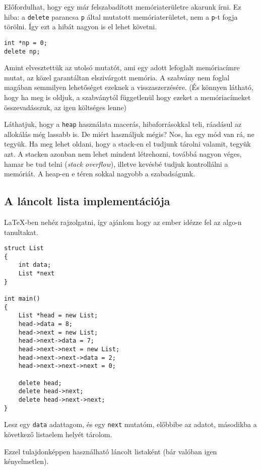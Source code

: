 \documentclass[a4paper,11.5pt]{article}
\begin{document}
	Előfordulhat, hogy egy már felszabadított memóriaterületre akarunk írni. Ez hiba: a \texttt{delete} parancsa \texttt{p} által mutatott memóriaterületet, nem a \texttt{p}-t fogja törölni. Így ezt a hibát nagyon is el lehet követni.
	\begin{lstlisting}
int *np = 0;
delete np;
	\end{lstlisting}
	\begin{note}
		Amint elvesztettük az utolsó mutatót, ami egy adott lefoglalt memóriacímre mutat, az közel garantáltan elszivárgott memória. A szabvány nem foglal magában semmilyen lehetőséget ezeknek a visszaszerzésére. (És könnyen látható, hogy ha meg is oldjuk, a szabványtól függetlenül hogy ezeket a memóriacímeket összevadásszuk, az igen költséges lenne)
	\end{note}
	Láthatjuk, hogy a \texttt{heap} használata macerás, hibaforrásokkal teli, ráadásul az allokálás még lassabb is. De miért használjuk mégis? Nos, ha egy mód van rá, ne tegyük. Ha meg lehet oldani, hogy a stack-en el tudjunk tárolni valamit, tegyük azt. A stacken azonban nem lehet mindent létrehozni, továbbá nagyon véges, hamar be tud telni (\textit{stack overflow}), illetve kevésbé tudjuk kontrollálni a memóriát. A heap-en e téren sokkal nagyobb a szabadságunk.
	\subsection{A láncolt lista implementációja}
	\LaTeX-ben nehéz rajzolgatni, így ajánlom hogy az ember idézze fel az algo-n tanultakat.
	\begin{lstlisting}
struct List
{
	int data;
	List *next
}

int main()
{
	List *head = new List;
	head->data = 8;
	head->next = new List;
	head->next->data = 7;
	head->next->next = new List;
	head->next->next->data = 2;
	head->next->next->next = 0;
	
	delete head;
	delete head->next;
	delete head->next->next;
}
	\end{lstlisting}
	Lesz egy \texttt{data} adattagom, és egy \texttt{next} mutatóm, előbbibe az adatot, másodikba a következő listaelem helyét tárolom.
	
	Ezzel tulajdonképpen használható láncolt listaként (bár valóban igen kényelmetlen).
	\medskip
	
\end{document}
